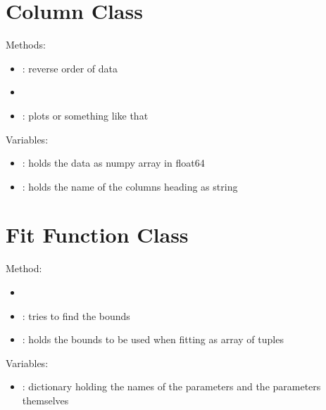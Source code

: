 \documentclass[letterpaper,10pt,english]{sphinxmanual}
\begin{document}
\section{Column Class}
\label{\detokenize{sprints:column-class}}
Methods:
\begin{itemize}
\item {} 
: reverse order of data

\item {} 

\item {} 
: plots  or something like that

\end{itemize}

Variables:
\begin{itemize}
\item {} 
: holds the data as numpy array in float64

\item {} 
: holds the name of the columns heading as string

\end{itemize}


\section{Fit Function Class}
\label{\detokenize{sprints:fit-function-class}}
Method:
\begin{itemize}
\item {} 

\item {} 
: tries to find the bounds

\item {} 
: holds the bounds to be used when fitting as array of tuples

\end{itemize}

Variables:
\begin{itemize}
\item {} 
: dictionary holding the names of the parameters and the parameters themselves

\end{itemize}
\end{document}

